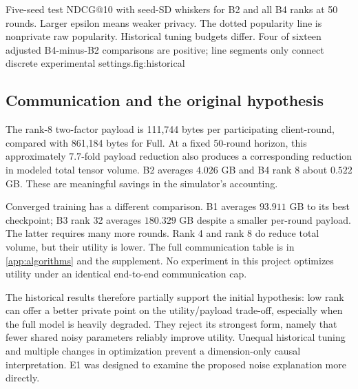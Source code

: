 {Five-seed test NDCG@10 with seed-SD whiskers for B2 and all B4 ranks at 50
rounds. Larger epsilon means weaker privacy. The dotted popularity line is
nonprivate raw popularity. Historical tuning budgets differ. Four of sixteen
adjusted B4-minus-B2 comparisons are positive; line segments only connect
discrete experimental settings.}{fig:historical}

\subsection{Communication and the original hypothesis}
The rank-8 two-factor payload is 111,744 bytes per participating client-round,
compared with 861,184 bytes for Full. At a fixed 50-round horizon, this
approximately $7.7$-fold payload reduction also produces a corresponding
reduction in modeled total tensor volume. B2 averages $4.026$ GB and B4 rank
8 about $0.522$ GB. These are meaningful savings in the simulator's accounting.

Converged training has a different comparison. B1 averages $93.911$ GB to its
best checkpoint; B3 rank 32 averages $180.329$ GB despite a smaller per-round
payload. The latter requires many more rounds. Rank 4 and rank 8 do reduce
total volume, but their utility is lower. The full communication table is in
\cref{app:algorithms} and the supplement. No experiment in this project
optimizes utility under an identical end-to-end communication cap.

The historical results therefore partially support the initial hypothesis:
low rank can offer a better private point on the utility/payload trade-off,
especially when the full model is heavily degraded. They reject its strongest
form, namely that fewer shared noisy parameters reliably improve utility.
Unequal historical tuning and multiple changes in optimization prevent a
dimension-only causal interpretation. E1 was designed to examine the proposed
noise explanation more directly.
\FloatBarrier
